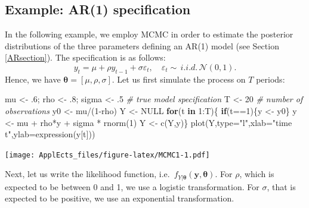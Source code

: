 \documentclass[
  12pt,
]{book}
\newenvironment{Shaded}{\begin{snugshade}}{\end{snugshade}}
\newcommand{\AttributeTok}[1]{\textcolor[rgb]{0.77,0.63,0.00}{#1}}
\newcommand{\CommentTok}[1]{\textcolor[rgb]{0.56,0.35,0.01}{\textit{#1}}}
\newcommand{\ConstantTok}[1]{\textcolor[rgb]{0.00,0.00,0.00}{#1}}
\newcommand{\ControlFlowTok}[1]{\textcolor[rgb]{0.13,0.29,0.53}{\textbf{#1}}}
\newcommand{\DecValTok}[1]{\textcolor[rgb]{0.00,0.00,0.81}{#1}}
\newcommand{\FunctionTok}[1]{\textcolor[rgb]{0.00,0.00,0.00}{#1}}
\newcommand{\NormalTok}[1]{#1}
\newcommand{\OtherTok}[1]{\textcolor[rgb]{0.56,0.35,0.01}{#1}}
\newcommand{\SpecialCharTok}[1]{\textcolor[rgb]{0.00,0.00,0.00}{#1}}
\newcommand{\StringTok}[1]{\textcolor[rgb]{0.31,0.60,0.02}{#1}}
\theoremstyle{definition}
\theoremstyle{definition}
\theoremstyle{definition}
\theoremstyle{definition}
\theoremstyle{remark}
\begin{document}
\hypertarget{example-ar1-specification}{%
\subsection{Example: AR(1) specification}\label{example-ar1-specification}}

In the following example, we employ MCMC in order to estimate the posterior distributions of the three parameters defining an AR(1) model (see Section \ref{ARsection}). The specification is as follows:
\[
y_t = \mu + \rho y_{t-1} + \sigma \varepsilon_{t}, \quad \varepsilon_t \sim \,i.i.d.\,\mathcal{N}(0,1).
\]
Hence, we have \({\boldsymbol\theta} = [\mu,\rho,\sigma]\). Let us first simulate the process on \(T\) periods:

\begin{Shaded}
\begin{Highlighting}[]
\NormalTok{mu }\OtherTok{\textless{}{-}}\NormalTok{ .}\DecValTok{6}\NormalTok{; rho }\OtherTok{\textless{}{-}}\NormalTok{ .}\DecValTok{8}\NormalTok{; sigma }\OtherTok{\textless{}{-}}\NormalTok{ .}\DecValTok{5} \CommentTok{\# true model specification}
\NormalTok{T }\OtherTok{\textless{}{-}} \DecValTok{20} \CommentTok{\# number of observations}
\NormalTok{y0 }\OtherTok{\textless{}{-}}\NormalTok{ mu}\SpecialCharTok{/}\NormalTok{(}\DecValTok{1}\SpecialCharTok{{-}}\NormalTok{rho)}
\NormalTok{Y }\OtherTok{\textless{}{-}} \ConstantTok{NULL}
\ControlFlowTok{for}\NormalTok{(t }\ControlFlowTok{in} \DecValTok{1}\SpecialCharTok{:}\NormalTok{T)\{}
  \ControlFlowTok{if}\NormalTok{(t}\SpecialCharTok{==}\DecValTok{1}\NormalTok{)\{y }\OtherTok{\textless{}{-}}\NormalTok{ y0\}}
\NormalTok{  y }\OtherTok{\textless{}{-}}\NormalTok{ mu }\SpecialCharTok{+}\NormalTok{ rho}\SpecialCharTok{*}\NormalTok{y }\SpecialCharTok{+}\NormalTok{ sigma }\SpecialCharTok{*} \FunctionTok{rnorm}\NormalTok{(}\DecValTok{1}\NormalTok{)}
\NormalTok{  Y }\OtherTok{\textless{}{-}} \FunctionTok{c}\NormalTok{(Y,y)\}}
\FunctionTok{plot}\NormalTok{(Y,}\AttributeTok{type=}\StringTok{"l"}\NormalTok{,}\AttributeTok{xlab=}\StringTok{"time t"}\NormalTok{,}\AttributeTok{ylab=}\FunctionTok{expression}\NormalTok{(y[t]))}
\end{Highlighting}
\end{Shaded}

\texttt{[image: ApplEcts\_files/figure-latex/MCMC1-1.pdf]}

Next, let us write the likelihood function, i.e.~\(f_{Y|{\boldsymbol\theta}}(\mathbf{y},{\boldsymbol\theta})\). For \(\rho\), which is expected to be between 0 and 1, we use a logistic transformation. For \(\sigma\), that is expected to be positive, we use an exponential transformation.
\end{document}
